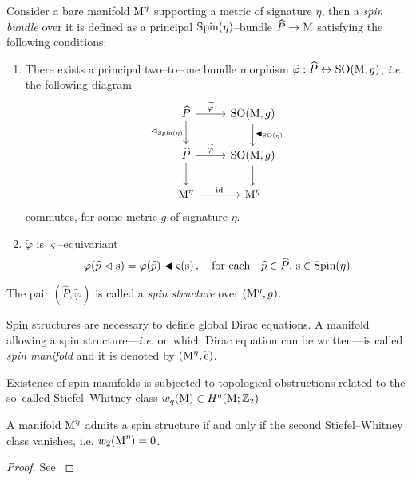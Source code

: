 \begin{defi}
    Consider a bare manifold $\text{\normalfont M}^\eta$ supporting a metric of signature $\eta$, then a \emph{spin bundle} over it is defined as a principal $\text{\normalfont Spin}(\eta)$--bundle $\widehat{P}\to\text{\normalfont M}$ satisfying the following conditions:
    \begin{enumerate}
        \item There exists a principal two--to--one bundle morphism $\widetilde{\varphi}:\widehat{P}\leftrightarrow\text{\normalfont SO}(\text{\normalfont M},g)$, \emph{i.e.} the following diagram
        \[\begin{tikzcd}
\widehat{P}\arrow{r}{\widetilde{\varphi}} \arrow[swap]{d}{\vartriangleleft_{\Spin(\eta)}} & \SO(\M,g) \arrow{d}{\blacktriangleleft_{\SO(\eta)}} \\
\widehat{P}\arrow{r}{\widetilde{\varphi}}\arrow[swap]{d} & \SO(\M,g)\arrow[swap]{d} \\
\M^\eta\arrow{r}{\id} & \M^\eta
\end{tikzcd}
\]   
commutes, for some metric $g$ of signature $\eta$.
        \item $\widetilde{\varphi}$ is $\varsigma$--equivariant
        $$\varphi(\widehat{p}\vartriangleleft\text{\normalfont s})=\varphi(\widehat{p})\blacktriangleleft\varsigma(\text{\normalfont s})\,, \quad\text{for each}\quad\widehat{p}\in\widehat{P},\,\text{\normalfont s}\in\text{\normalfont Spin}(\eta)$$
    \end{enumerate}
    The pair $(\widehat{P},\widetilde{\varphi})$ is called a \emph{spin structure} over $(\text{\normalfont M}^\eta,g)$.
\end{defi}
\begin{remark}
    Spin structures are necessary to define global Dirac equations. A manifold allowing a spin structure---\emph{i.e.} on which Dirac equation can be written---is called \emph{spin manifold} and it is denoted by $(\text{\normalfont M}^\eta,\widetilde{\text{\normalfont e}})$.
\end{remark}
  Existence of spin manifolds is subjected to topological obstructions related to the so--called Stiefel--Whitney class $w_q(\text{\normalfont M})\in H^q(\text{\normalfont M};\mathbb{Z}_2)$
\begin{teo}
    A manifold $\text{\normalfont M}^\eta$ admits a spin structure if and only if the second Stiefel--Whitney class vanishes, i.e. $w_2(\text{\normalfont M}^\eta)=0$.
\end{teo}
\begin{proof}
    See \cite{spin}
\end{proof}

